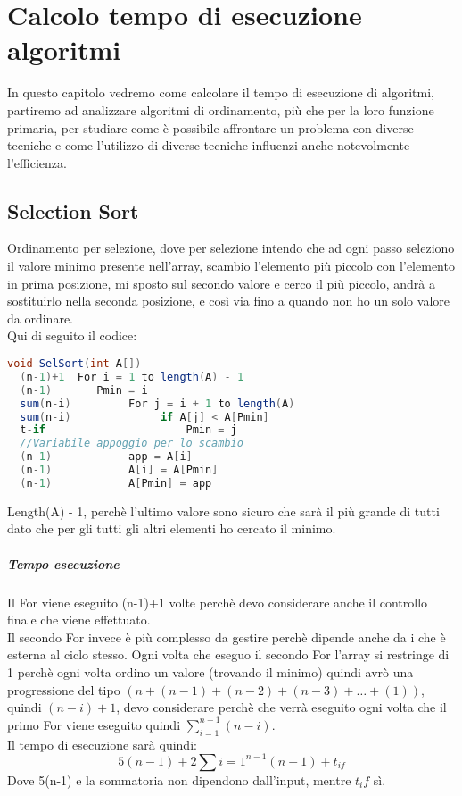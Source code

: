 \chapter{Calcolo tempo di esecuzione algoritmi}
In questo capitolo vedremo come calcolare il tempo di esecuzione di algoritmi,
partiremo ad analizzare algoritmi di ordinamento, più che per la loro
funzione primaria, per studiare come è possibile affrontare un problema con diverse
tecniche e come l'utilizzo di diverse tecniche influenzi anche notevolmente l'efficienza.
\section{Selection Sort}
Ordinamento per selezione, dove per selezione intendo che ad ogni passo seleziono
il valore minimo presente nell'array, scambio l'elemento più piccolo con l'elemento in
prima posizione, mi sposto sul secondo valore e cerco il più piccolo, andrà a sostituirlo
nella seconda posizione, e così via fino a quando non ho un solo valore da ordinare.\\
Qui di seguito il codice:
\begin{lstlisting}[language=Java]
void SelSort(int A[])
  (n-1)+1  For i = 1 to length(A) - 1
  (n-1)       Pmin = i
  sum(n-i)         For j = i + 1 to length(A)
  sum(n-i)              if A[j] < A[Pmin]
  t-if                      Pmin = j
  //Variabile appoggio per lo scambio
  (n-1)            app = A[i] 
  (n-1)            A[i] = A[Pmin]
  (n-1)            A[Pmin] = app
\end{lstlisting}
Length(A) - 1, perchè l'ultimo valore sono sicuro che sarà il più grande di tutti
dato che per gli tutti gli altri elementi ho cercato il minimo.\\
\paragraph*{Tempo esecuzione} Il For viene eseguito (n-1)+1 volte perchè devo
considerare anche il controllo finale che viene effettuato.\\
Il secondo For invece è più complesso da gestire perchè dipende anche da i che è esterna
al ciclo stesso. Ogni volta che eseguo il secondo For l'array si restringe di 1 perchè ogni
volta ordino un valore (trovando il minimo) quindi avrò una progressione del tipo $(n + (n-1) +
(n-2) + (n-3) + \dots + (1))$, quindi $(n-i) + 1 $, devo considerare perchè che verrà eseguito
ogni volta che il primo For viene eseguito quindi $\sum_{i=1}^{n-1}(n-i)$.\\
Il tempo di esecuzione sarà quindi:
\begin{equation*}
    5(n-1) + 2\sum{i=1}^{n-1} (n-1) + t_{if}
\end{equation*}
Dove 5(n-1) e la sommatoria non dipendono dall'input, mentre $t_if$ sì.
